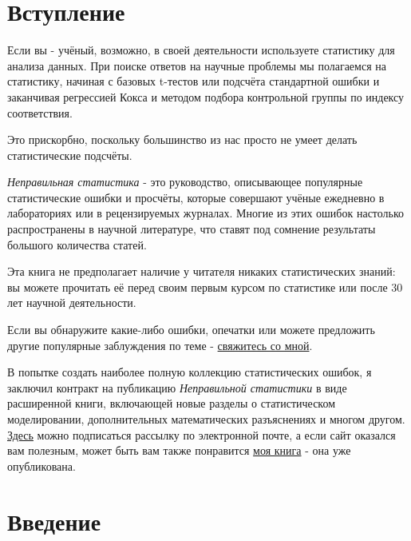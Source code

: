 \chapter*{Вступление}
\label{chp0}
Если вы - учёный, возможно, в своей деятельности используете статистику для анализа данных. При поиске ответов на научные проблемы мы полагаемся на статистику, начиная с базовых t-тестов или подсчёта стандартной ошибки и заканчивая регрессией Кокса и методом подбора контрольной группы по индексу соответствия. %

Это прискорбно, поскольку большинство из нас просто не умеет делать статистические подсчёты.

\emph{Неправильная статистика} - это руководство, описывающее популярные статистические ошибки и просчёты, которые совершают учёные ежедневно в лабораториях или в рецензируемых журналах. Многие из этих ошибок настолько распространены в научной литературе, что ставят под сомнение результаты большого количества статей.

Эта книга не предполагает наличие у читателя никаких статистических знаний: вы можете прочитать её перед своим первым курсом по статистике или после 30 лет научной деятельности.

Если вы обнаружите какие-либо ошибки, опечатки или можете предложить другие популярные заблуждения по теме -  \hyperref[chp1:contact]{свяжитесь со мной}. 

В попытке создать наиболее полную коллекцию статистических ошибок, я заключил контракт на публикацию \emph{Неправильной статистики} в виде расширенной книги, включающей новые разделы о статистическом моделировании, дополнительных математических разъяснениях и многом другом. \href{http://statisticsdonewrong.com}{Здесь} можно подписаться рассылку по электронной почте, а если сайт оказался вам полезным, может быть вам также понравится \href{http://www.nostarch.com/statsdonewrong}{моя книга} - она уже опубликована.


\chapter{Введение}
\label{chp1}

